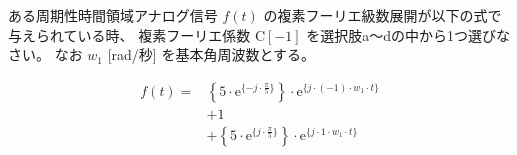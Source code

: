 ある周期性時間領域アナログ信号 $f(t)$ の複素フーリエ級数展開が以下の式で与えられている時、
複素フーリエ係数 $\textrm{C}[-1]$ を選択肢a〜dの中から1つ選びなさい。
なお $w_1$ [rad/秒] を基本角周波数とする。

\begin{align*}
f(t) =
&  \left \{ 5 \cdot \textrm{e}^{\{-j \cdot \frac{\pi}{5} \}} \right \} \cdot \textrm{e}^{\{ j \cdot (-1) \cdot w_1 \cdot t \}}  \\
&+ 1 \\
&+ \left \{ 5 \cdot \textrm{e}^{\{ j \cdot \frac{\pi}{5} \}} \right \} \cdot \textrm{e}^{\{ j \cdot 1 \cdot w_1 \cdot t \}} 
\end{align*}
